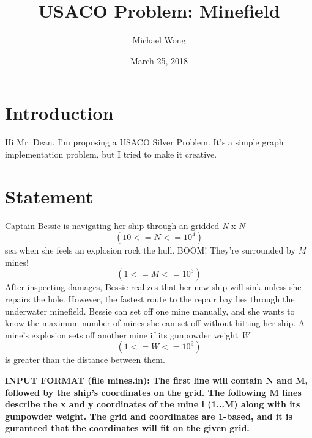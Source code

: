 \documentclass[12pt]{article}
\begin{document}
\title{USACO Problem: Minefield}

\author{Michael Wong}
\date{March 25, 2018}

\maketitle

\section{Introduction}
Hi Mr. Dean. I'm proposing a USACO Silver Problem. It's a simple graph implementation problem, but I tried to make it creative.

\section{Statement}

Captain Bessie is navigating her ship through an gridded \emph N x \emph N \begin{equation*} (10 <= N <= 10^4) \end{equation*} sea when she feels an explosion rock the hull. BOOM! They're surrounded by \emph M mines! \begin{equation*} (1 <= M <= 10^3) \end{equation*} After inspecting damages, Bessie realizes that her new ship will sink unless she repairs the hole. However, the fastest route to the repair bay lies through the underwater minefield. Bessie can set off one mine manually, and she wants to know the maximum number of mines she can set off without hitting her ship. A mine's explosion sets off another mine if its gunpowder weight \emph W\begin{equation*} (1 <= W <= 10^9)\end{equation*} is greater than the distance between them.

\bf \noindent \newline INPUT FORMAT \normalfont(file mines.in):
\newline The first line will contain N and M, followed by the ship's coordinates on the grid. The following M lines describe the x and y coordinates of the mine i (1...M) along with its gunpowder weight. The grid and coordinates are 1-based, and it is guranteed that the coordinates will fit on the given grid.
\end{document}
